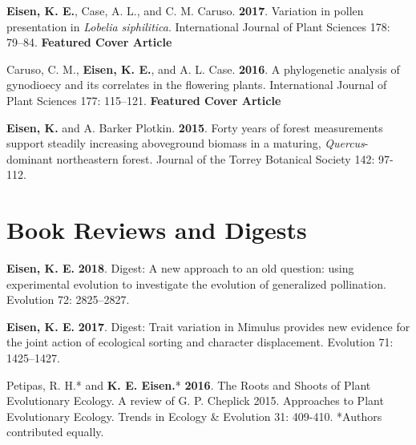 \documentclass[letterpaper,11pt]{article}
\begin{document}
\begin{etaremune}
\newpage
\vspace*{2mm}
\item \textbf{Eisen, K. E.}, Case, A. L., and C. M. Caruso. \textbf{2017}. Variation in pollen presentation in \textit{Lobelia siphilitica}. International Journal of Plant Sciences 178: 79–84. \textbf{Featured Cover Article}\\

\item Caruso, C. M., \textbf{Eisen, K. E.}, and A. L. Case. \textbf{2016}. A phylogenetic analysis of gynodioecy and its correlates in the flowering plants. International Journal of Plant Sciences 177: 115–121. \textbf{Featured Cover Article}\\

\item \textbf{Eisen, K.} and A. Barker Plotkin. \textbf{2015}. Forty years of forest measurements support steadily increasing aboveground biomass in a maturing, \textit{Quercus}-dominant northeastern forest. Journal of the Torrey Botanical Society 142: 97-112.
\end{etaremune}


\section{Book Reviews and Digests}
\begin{etaremune}
\item \textbf{Eisen, K. E.} \textbf{2018}. Digest: A new approach to an old question: using experimental evolution to investigate the evolution of generalized pollination. Evolution 72: 2825–2827.\\
\item \textbf{Eisen, K. E.} \textbf{2017}. Digest: Trait variation in Mimulus provides new evidence for the joint action of ecological sorting and character displacement. Evolution 71: 1425–1427.\\
\item Petipas, R. H.* and \textbf{K. E. Eisen.}* \textbf{2016}. The Roots and Shoots of Plant Evolutionary Ecology. A review of G. P. Cheplick 2015. Approaches to Plant Evolutionary Ecology. Trends in Ecology \& Evolution 31: 409-410. *Authors contributed equally.\\
\end{etaremune}
\end{document}
